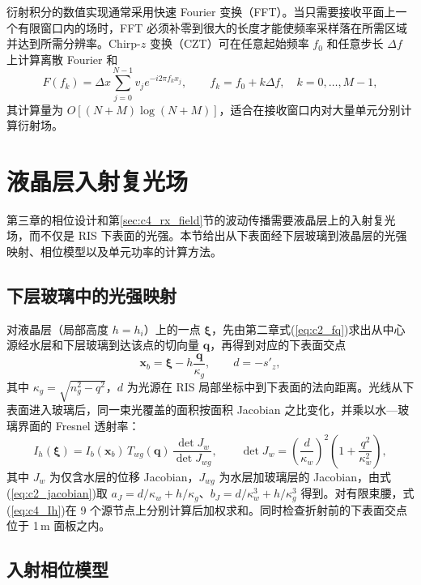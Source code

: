 衍射积分的数值实现通常采用快速 Fourier 变换（FFT）。当只需要接收平面上一个有限窗口内的场时，FFT 必须补零到很大的长度才能使频率采样落在所需区域并达到所需分辨率。Chirp-$z$ 变换（CZT）可在任意起始频率 $f_0$ 和任意步长 $\Delta f$ 上计算离散 Fourier 和
\begin{equation}
F(f_k)=\Delta x\sum_{j=0}^{N-1}v_je^{-i2\pi f_kx_j},\qquad f_k=f_0+k\Delta f,\quad k=0,\ldots,M-1,
\label{eq:c2_czt}
\end{equation}
其计算量为 $O[(N+M)\log(N+M)]$，适合在接收窗口内对大量单元分别计算衍射场。

\section{液晶层入射复光场}
\label{sec:c4_lc_field}

第三章的相位设计和第\ref{sec:c4_rx_field}节的波动传播需要液晶层上的入射复光场，而不仅是 RIS 下表面的光强。本节给出从下表面经下层玻璃到液晶层的光强映射、相位模型以及单元功率的计算方法。

\subsection{下层玻璃中的光强映射}

对液晶层（局部高度 $h=h_i$）上的一点 $\boldsymbol\xi$，先由第二章式(\ref{eq:c2_fq})求出从中心源经水层和下层玻璃到达该点的切向量 $\mathbf q$，再得到对应的下表面交点
\begin{equation}
\mathbf x_b=\boldsymbol\xi-h\frac{\mathbf q}{\kappa_g},\qquad d=-s'_z,
\label{eq:c4_xb}
\end{equation}
其中 $\kappa_g=\sqrt{n_g^2-q^2}$，$d$ 为光源在 RIS 局部坐标中到下表面的法向距离。光线从下表面进入玻璃后，同一束光覆盖的面积按面积 Jacobian 之比变化，并乘以水—玻璃界面的 Fresnel 透射率：
\begin{equation}
I_h(\boldsymbol\xi)=I_b(\mathbf x_b)\,T_{wg}(\mathbf q)\,\frac{\det J_w}{\det J_{wg}},\qquad
\det J_w=\left(\frac{d}{\kappa_w}\right)^2\left(1+\frac{q^2}{\kappa_w^2}\right),
\label{eq:c4_Ih}
\end{equation}
其中 $J_w$ 为仅含水层的位移 Jacobian，$J_{wg}$ 为水层加玻璃层的 Jacobian，由式(\ref{eq:c2_jacobian})取 $a_J=d/\kappa_w+h/\kappa_g$、$b_J=d/\kappa_w^3+h/\kappa_g^3$ 得到。对有限束腰，式(\ref{eq:c4_Ih})在 9 个源节点上分别计算后加权求和。同时检查折射前的下表面交点位于 1\,m 面板之内。

\subsection{入射相位模型}


